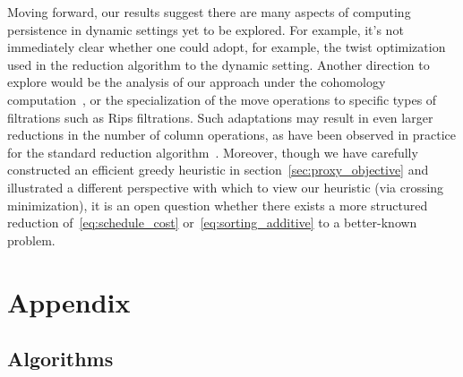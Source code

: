 \documentclass[sn-mathphys]{sn-jnl}
\begin{document}
Moving forward, our results suggest there are many aspects of computing persistence in dynamic settings yet to be explored. 
For example, it's not immediately clear whether one could adopt, for example, the twist optimization~\cite{chen2011persistent} used in the reduction algorithm to the dynamic setting. Another direction to explore would be the analysis of our approach under the cohomology computation~\cite{de2011dualities}, or the specialization of the move operations to specific types of filtrations such as Rips filtrations. Such adaptations may result in even larger reductions in the number of column operations, as have been observed in practice for the standard reduction algorithm~\cite{bauer2021ripser}. 
Moreover, though we have carefully constructed an efficient greedy heuristic in section~\ref{sec:proxy_objective} and illustrated a different perspective with which to view our heuristic (via crossing minimization), it is an open question whether there exists a more structured reduction of~\eqref{eq:schedule_cost} or~\eqref{eq:sorting_additive} to a better-known problem. 


%
%


\newpage 
\appendix
\section{Appendix}

\subsection{Algorithms}
\end{document}
